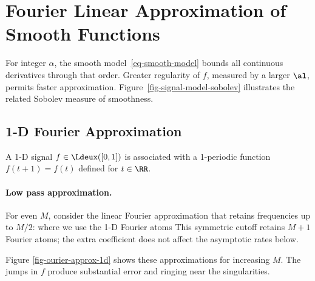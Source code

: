 \section{Fourier Linear Approximation of Smooth Functions}

For integer $\alpha$, the smooth model~\eqref{eq-smooth-model} bounds all continuous derivatives through that order. Greater regularity of $f$, measured by a larger $\al$, permits faster approximation. Figure~\ref{fig-signal-model-sobolev} illustrates the related Sobolev measure of smoothness.

                                        
\subsection{1-D Fourier Approximation}

A 1-D signal $f \in \Ldeux([0,1])$ is associated with a 1-periodic function $f(t+1)=f(t)$ defined for $t \in \RR$.

  
\paragraph{Low pass approximation.}

For even $M$, consider the linear Fourier approximation that retains frequencies up to $M/2$:
where we use the 1-D Fourier atoms
This symmetric cutoff retains $M+1$ Fourier atoms; the extra coefficient does not affect the asymptotic rates below.

Figure \ref{fig-ourier-approx-1d} shows these approximations for increasing $M$. The jumps in $f$ produce substantial error and ringing near the singularities.

                                                                                                                                                               


                                       
                                                                                                                                                                                                      

